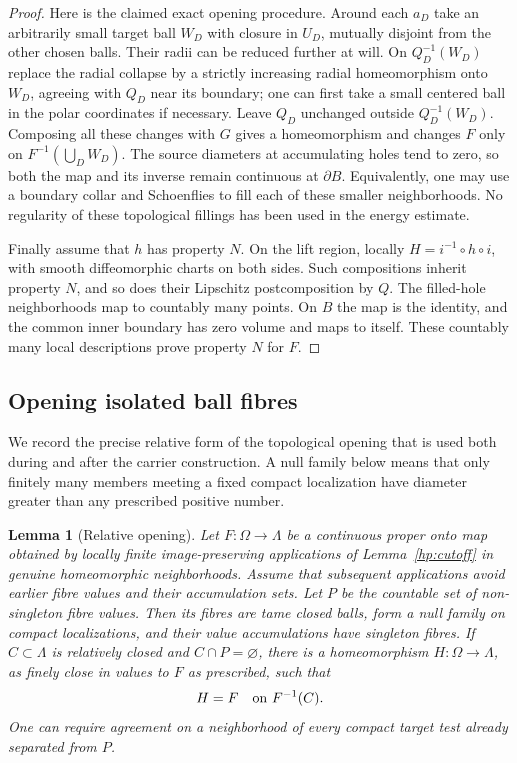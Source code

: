 \documentclass[11pt]{article}
\numberwithin{equation}{section}
\newtheorem{lemma}[theorem]{Lemma}
\theoremstyle{definition}
\theoremstyle{remark}
\begin{document}
\begin{proof}
Here is the claimed exact opening procedure.  Around each $a_D$ take
an arbitrarily small target ball $W_D$ with closure in $U_D$, mutually
disjoint from the other chosen balls.  Their radii can be reduced
further at will.  On $Q_D^{-1}(W_D)$ replace the radial collapse by
a strictly increasing radial homeomorphism onto $W_D$, agreeing
with $Q_D$ near its boundary; one can first take a small centered
ball in the polar coordinates if necessary.  Leave $Q_D$ unchanged
outside $Q_D^{-1}(W_D)$.  Composing all these changes with $G$ gives
a homeomorphism and changes $F$ only on $F^{-1}(\bigcup_D W_D)$.
The source diameters at accumulating holes tend to zero, so both
the map and its inverse remain continuous at $\partial B$.
Equivalently, one may use a boundary collar and Schoenflies to fill
each of these smaller neighborhoods.  No regularity of these
topological fillings has been used in the energy estimate.

Finally assume that $h$ has property $N$.  On the lift region,
locally $H=i^{-1}\circ h\circ i$, with smooth diffeomorphic charts
on both sides.  Such compositions inherit property $N$, and so
does their Lipschitz postcomposition by $Q$.  The filled-hole
neighborhoods map to countably many points.  On $B$ the map is the
identity, and the common inner boundary has zero volume and maps
to itself.  These countably many local descriptions prove property
$N$ for $F$.
\end{proof}

\subsection{Opening isolated ball fibres}

We record the precise relative form of the topological opening that is
used both during and after the carrier construction.  A null family
below means that only finitely many members meeting a fixed compact
localization have diameter greater than any prescribed positive
number.

\begin{lemma}[Relative opening]\label{hp:opening}
Let $F:\Omega\to\Lambda$ be a continuous proper onto map obtained by
locally finite image-preserving applications of
Lemma~\ref{hp:cutoff} in genuine homeomorphic neighborhoods.  Assume
that subsequent applications avoid earlier fibre values and their
accumulation sets.  Let $P$ be the countable set of non-singleton
fibre values.  Then its fibres are tame closed balls, form a null
family on compact localizations, and their value accumulations have
singleton fibres.  If $C\subset\Lambda$ is relatively closed and
$C\cap P=\varnothing$, there is a homeomorphism
$H:\Omega\to\Lambda$, as finely close in values to $F$ as prescribed,
such that
\begin{equation}\label{hp:relative-opening-agreement}
 H=F\quad\hbox{on }F^{-1}(C).
\end{equation}
One can require agreement on a neighborhood of every compact target
test already separated from $P$.
\end{lemma}
\end{document}
